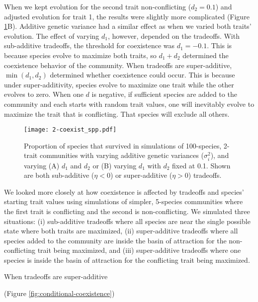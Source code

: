 When we kept evolution for the second trait non-conflicting ($d_2 = 0.1$) and
adjusted evolution for trait 1, the results were slightly more complicated
(Figure \ref{fig:coexistence-spp}B).
Additive genetic variance had a similar effect as when we varied both traits' evolution.
The effect of varying $d_1$, however, depended on the tradeoffs.
With sub-additive tradeoffs, the threshold for coexistence was $d_1 = -0.1$.
This is because species evolve to maximize both traits, so $d_1 + d_2$
determined the coexistence behavior of the community.
When tradeoffs are super-additive, $\min (d_1, d_2)$ determined whether 
coexistence could occur.
This is because under super-additivity, species evolve to maximize one trait while 
the other evolves to zero.
When one $d$ is negative, if sufficient species are added to the community and 
each starts with random trait values, 
one will inevitably evolve to maximize the trait that is conflicting. 
That species will exclude all others.


\begin{figure}[ht!]
\centering
\texttt{[image: 2-coexist\_spp.pdf]}
\caption{Proportion of species that survived in simulations of 100-species, 2-trait
    communities with varying additive genetic variances ($\sigma_i^2$), and 
    varying (A) $d_1$ and $d_2$ or (B) varying $d_1$ with $d_2$ fixed at 0.1.
    Shown are both sub-additive ($\eta < 0$) or super-additive ($\eta > 0$) tradeoffs.}
\label{fig:coexistence-spp}
\end{figure}


We looked more closely at how coexistence is affected by tradeoffs and 
species' starting trait values
using simulations of simpler, 5-species communities where the first 
trait is conflicting and the second is non-conflicting.
We simulated three situations:
(i) sub-additive tradeoffs where all species are near the single
possible state where both traits are maximized,
(ii) super-additive tradeoffs where all species added to the community
are inside the basin of attraction for the non-conflicting trait
being maximized,
and
(iii) super-additive tradeoffs where one species is
inside the basin of attraction for the conflicting trait
being maximized.

When tradeoffs are super-additive 

 (Figure
\ref{fig:conditional-coexistence})

